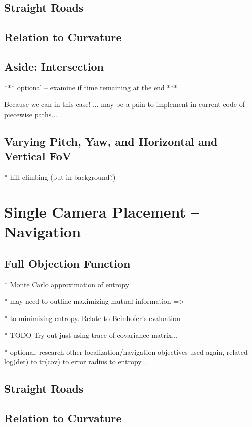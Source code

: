 \documentclass[a4paper,12pt,twoside,openright]{report}
\begin{document}
\subsection{Straight Roads}

\subsection{Relation to Curvature}

\subsection{Aside: Intersection}

*** optional -- examine if time remaining at the end ***

Because we can in this case! ... may be a pain to implement in current code of piecewise paths...

\subsection{Varying Pitch, Yaw, and Horizontal and Vertical FoV}

* hill climbing (put in background?)


\section{Single Camera Placement -- Navigation}

\subsection{Full Objection Function}
* Monte Carlo approximation of entropy

* may need to outline maximizing mutual information =>

* to minimizing entropy. Relate to Beinhofer's evaluation

* TODO Try out just using trace of covariance matrix...

* optional: research other localization/navigation objectives used again, related log(det) to tr(cov) to error radius to entropy...
\subsection{Straight Roads}

\subsection{Relation to Curvature}
\end{document}
